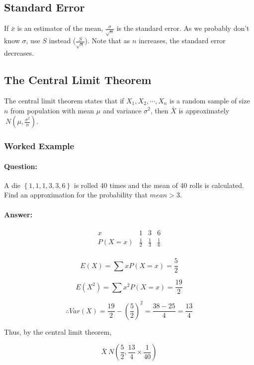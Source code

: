 \documentclass{article}
\begin{document}
\subsection{Standard Error}

If $\bar{x}$ is an estimator of the mean, $\frac{\sigma}{\sqrt n}$ is the
standard error. As we probably don't know $\sigma$, use $S$ instead
($\frac{S}{\sqrt n}$). Note that as $n$ increases, the standard error decreases.

\subsection{The Central Limit Theorem}

The central limit theorem states that if $X_1,X_2,\cdots,X_n$ is a random sample
of size $n$ from population with mean $\mu$ and variance $\sigma^2$, then
$\bar{X}$ is approximately $~ N \left(\mu, \frac{\sigma^2}{n}\right)$.

\subsubsection{Worked Example}

\paragraph{Question:} A die $\left\{1, 1, 1, 3, 3, 6\right\}$ is rolled 40 times 
and the mean of 40 rolls is calculated. Find an approximation for the
probability that $\textit{mean}>3$.

\paragraph{Answer:}
\[\begin{array}{cccc}
    x      & 1           & 3           & 6 \\
    P(X=x) & \frac{1}{2} & \frac{1}{3} & \frac{1}{6} \\
\end{array}\]

\[E(X)=\sum x P(X=x) = \frac{5}{2}\]

\[E(X^2)=\sum x^2 P(X=x) = \frac{19}{2}\]

\[\therefore Var(X) = \frac{19}{2} - \left(\frac{5}{2}\right)^2 = \frac{38 -
25}{4} = \frac{13}{4}\]

\noindent Thus, by the central limit theorem,

\[\bar{X} ~ N\left(\frac{5}{2}, \frac{13}{4} \times \frac{1}{40}\right)\]
    
\end{document}
